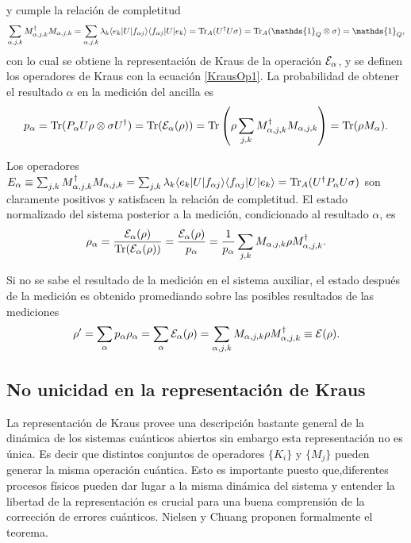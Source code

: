 y cumple la relación de completitud \[\sum_{\alpha, j,k} M_{\alpha,j,k}^\dagger M_{\alpha,j,k}=\sum_{\alpha, j,k} \lambda_k \la e_k|U|f_{\alpha j}\ra \la f_{\alpha j}|U|e_k\ra= \tr_A(U^\dagger U \sigma)=\tr_A(\mathds{1}_Q\otimes\sigma)=\mathds{1}_Q,\] con lo cual se obtiene la representación de Kraus de la operación $\mathcal{E}_\alpha$, y se definen los operadores de Kraus con la ecuación {\ref{KrausOp1}}. La probabilidad de obtener el resultado $\alpha$ en la medición del ancilla es {\cite{unm2014}}
\begin{equation}
    p_\alpha={\rm Tr}(P_\alpha U\rho\otimes\sigma U^\dagger)={\rm Tr}(\mathcal{E}_\alpha(\rho))={\rm Tr}\left(\rho \sum _{j,k} M_{\alpha, j,k}^\dagger M_{\alpha,j,k}\right)={\rm Tr}(\rho M_\alpha).
\end{equation}


Los operadores $E_\alpha \equiv \sum _{j,k} M_{\alpha, j,k}^\dagger M_{\alpha,j,k}=\sum_{j,k} \lambda_k \langle e_k|U|f_{\alpha j}\rangle \langle f_{\alpha j}|U|e_k\rangle={\rm Tr}_A(U^\dagger P_\alpha U\sigma) $ son claramente positivos y satisfacen la relación de completitud. El estado normalizado del sistema posterior a la medición, condicionado al resultado $\alpha$, es {\cite{unm2014}}
\begin{equation}
    \rho_\alpha =\dfrac{\mathcal{E}_\alpha (\rho)}{{\rm Tr}(\mathcal{E}_\alpha(\rho))}=\dfrac{\mathcal{E}_\alpha(\rho)}{p_\alpha}=\dfrac{1}{p_\alpha}\sum_{j,k}M_{\alpha,j,k}\rho M_{\alpha,j,k}^\dagger.
\end{equation}

Si no se sabe el resultado de la medición en el sistema auxiliar, el estado después de la medición es obtenido promediando sobre las posibles resultados de las mediciones {\cite{unm2014}}
\begin{equation}
    \rho'=\sum_\alpha p_\alpha \rho_\alpha=\sum_\alpha \mathcal{E}_\alpha(\rho)=\sum_{\alpha,j,k} M_{\alpha,j,k}\rho M_{\alpha,j,k}^\dagger\equiv\mathcal{E}(\rho).
\end{equation}


\subsection{No unicidad en la representación de Kraus}
 La representación de Kraus provee una descripción bastante general de la dinámica de los sistemas cuánticos abiertos sin embargo esta representación no es única. Es decir que distintos conjuntos de operadores $\{K_i\}$ y $\{M_j\}$ pueden generar la misma operación cuántica. Esto es importante puesto que,diferentes procesos físicos pueden dar lugar a la misma dinámica del sistema y entender la libertad de la representación es crucial para una buena comprensión de la corrección de errores cuánticos. Nielsen y Chuang {\cite{nielsen_chuang_2010}} proponen formalmente el teorema.


